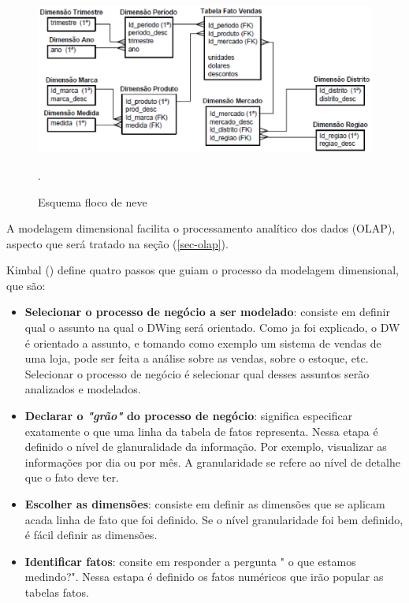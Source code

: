  \begin{figure}[!htb]
 	\centering
 		\includegraphics[scale=0.8]{figuras/dw-modelo-flocodeneve}
 		\caption{Esquema floco de neve}.
 		\label{dw-snowflackscheme}
 \end{figure}

%

A modelagem dimensional facilita o processamento analítico dos dados (OLAP), aspecto que será tratado na seção (\ref{sec-olap}).

%

 Kimbal (\citeyear{kimball2002}) define quatro passos que guiam o processo da modelagem dimensional, que são:


 \begin{itemize}
 	\item \textbf{Selecionar o processo de negócio a ser modelado}: consiste em definir qual o assunto na qual o DWing será orientado. Como ja foi explicado, o DW é orientado a assunto, e tomando como exemplo um sistema de vendas de uma loja, pode ser feita a análise sobre as vendas, sobre o estoque, etc. Selecionar o processo de negócio é selecionar qual desses assuntos serão analizados e modelados.
 	\item \textbf{Declarar o \emph{"grão"} do processo de negócio}: significa especificar exatamente o que uma linha da tabela de fatos representa. Nessa etapa é definido o nível de glanuralidade da informação. Por exemplo, visualizar as informações por dia ou por mês. A granularidade se refere ao nível de detalhe que o fato deve ter. 
 	\item \textbf{Escolher as dimensões}: consiste em definir as dimensões que se aplicam acada linha de fato que foi definido. Se o nível granularidade foi bem definido, é fácil definir as dimensões. 
 	\item \textbf{Identificar fatos}: consite em responder a pergunta "	o que estamos medindo?". Nessa estapa é definido os fatos numéricos que irão popular as tabelas fatos.	  
 \end{itemize}

